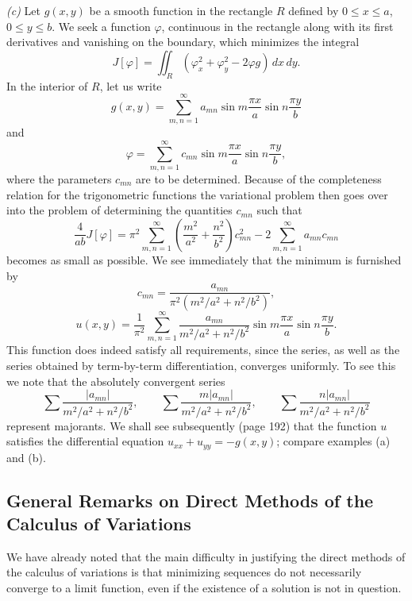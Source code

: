 \emph{(c)} Let $g(x,y)$ be a smooth function in the rectangle $R$ defined by $0\le x\le a$, $0\le y\le b$. We seek a function $\varphi$, continuous in the rectangle along with its first derivatives and vanishing on the boundary, which minimizes the integral
\begin{equation}\tag{11}
J[\varphi]=\iint_R(\varphi_x^2+\varphi_y^2-2\varphi g)\,dx\,dy.
\end{equation}
In the interior of $R$, let us write
\[
g(x,y)=\sum_{m,n=1}^{\infty}a_{mn}\sin m\frac{\pi x}{a}\sin n\frac{\pi y}{b}
\]
and
\[
\varphi=\sum_{m,n=1}^{\infty}c_{mn}\sin m\frac{\pi x}{a}\sin n\frac{\pi y}{b},
\]
where the parameters $c_{mn}$ are to be determined. Because of the completeness relation for the trigonometric functions the variational problem then goes over into the problem of determining the quantities $c_{mn}$ such that
\[
\frac{4}{ab}J[\varphi]
=\pi^2\sum_{m,n=1}^{\infty}\left(\frac{m^2}{a^2}+\frac{n^2}{b^2}\right)c_{mn}^2
-2\sum_{m,n=1}^{\infty}a_{mn}c_{mn}
\]
becomes as small as possible. We see immediately that the minimum is furnished by
\[
c_{mn}=\frac{a_{mn}}{\pi^2(m^2/a^2+n^2/b^2)},
\]
\begin{equation}\tag{12}
u(x,y)=\frac{1}{\pi^2}\sum_{m,n=1}^{\infty}\frac{a_{mn}}{m^2/a^2+n^2/b^2}\sin m\frac{\pi x}{a}\sin n\frac{\pi y}{b}.
\end{equation}
This function does indeed satisfy all requirements, since the series, as well as the series obtained by term-by-term differentiation, converges uniformly. To see this we note that the absolutely convergent series
\[
\sum\frac{|a_{mn}|}{m^2/a^2+n^2/b^2},\qquad
\sum\frac{m|a_{mn}|}{m^2/a^2+n^2/b^2},\qquad
\sum\frac{n|a_{mn}|}{m^2/a^2+n^2/b^2}
\]
represent majorants. We shall see subsequently (page 192) that the function $u$ satisfies the differential equation $u_{xx}+u_{yy}=-g(x,y)$; compare examples (a) and (b).

\subsection{General Remarks on Direct Methods of the Calculus of Variations}
We have already noted that the main difficulty in justifying the direct methods of the calculus of variations is that minimizing sequences do not necessarily converge to a limit function, even if the existence of a solution is not in question.

